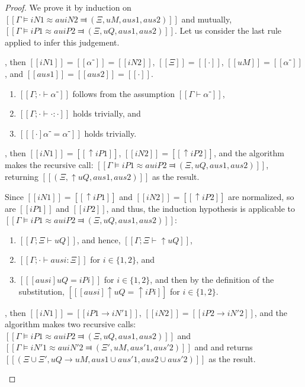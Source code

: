 \lemmaAuSoundness*
\begin{proof}
    We prove it by induction on 
    $[[Γ ⊨ iN1 ≈au iN2 ⫤ (Ξ, uM, aus1, aus2)]]$
    and mutually, $[[Γ ⊨ iP1 ≈au iP2 ⫤ (Ξ, uQ, aus1, aus2)]]$.
    Let us consider the last rule applied to infer this judgement.
    \begin{caseof}
        \item {}, then $[[iN1]] = [[α⁻]] = [[iN2]]$,
              $[[Ξ]] = [[·]]$, $[[uM]] = [[α⁻]]$, and $[[aus1]] = [[aus2]] = [[·]]$.
            \begin{enumerate}
                \item $[[Γ ; · ⊢ α⁻]]$ follows from the assumption $[[Γ ⊢ α⁻]]$,
                \item $[[Γ ; · ⊢ · : ·]]$ holds trivially, and
                \item $[[ [·] α⁻ = α⁻ ]]$ holds trivially.
            \end{enumerate}
        \item \label{case:anti-unification-soundness:shiftu}
         , then $[[iN1]] = [[↑iP1]]$,
                $[[iN2]] = [[↑iP2]]$, and the algorithm makes the recursive call:
                $[[Γ ⊨ iP1 ≈au iP2 ⫤ (Ξ, uQ, aus1, aus2)]]$, 
                returning $[[(Ξ, ↑uQ, aus1, aus2)]]$ as the result.

                Since $[[iN1]] = [[↑iP1]]$ and $[[iN2]] = [[↑iP2]]$ are normalized, 
                so are $[[iP1]]$ and $[[iP2]]$, and thus, the induction hypothesis 
                is applicable to $[[Γ ⊨ iP1 ≈au iP2 ⫤ (Ξ, uQ, aus1, aus2)]]$:
                \begin{enumerate}
                    \item $[[Γ ; Ξ ⊢ uQ]]$, and hence, $[[Γ ; Ξ ⊢ ↑uQ]]$,
                    \item $[[Γ ; · ⊢ ausi : Ξ]]$ for $i \in \{1,2\}$, and
                    \item $[[ [ausi] uQ = iPi ]]$ for $i \in \{1,2\}$, and then by 
                    the definition of the substitution, $[[ [ausi] ↑uQ = ↑iPi ]]$ for $i \in \{1,2\}$.
                \end{enumerate}

        \item {}, then $[[iN1]] = [[iP1 → iN'1]]$,
                $[[iN2]] = [[iP2 → iN'2]]$, and the algorithm makes two recursive calls:
                $[[Γ ⊨ iP1 ≈au iP2 ⫤ (Ξ, uQ, aus1, aus2)]]$ and
                $[[Γ ⊨ iN'1 ≈au iN'2 ⫤ (Ξ', uM, aus'1, aus'2)]]$ and
                and returns $[[(Ξ ∪ Ξ', uQ → uM, aus1 ∪ aus'1, aus2 ∪ aus'2)]]$ as the result.
                

\end{caseof}
\end{proof}
